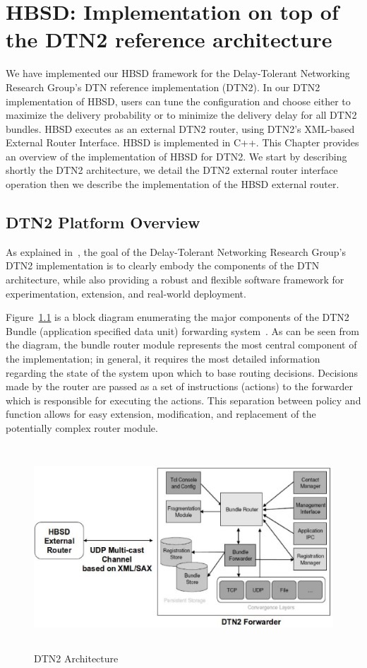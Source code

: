 ﻿\chapter{HBSD: Implementation on top of the DTN2 reference architecture}
\label{chapter:HBSD}
\minitoc

We have implemented our HBSD framework for the Delay-Tolerant Networking Research Group's DTN reference implementation (DTN2). 
In our DTN2 implementation of HBSD, users can tune the configuration and choose either to maximize the
delivery probability or to minimize the delivery delay for all DTN2 bundles. HBSD executes as an external DTN2 router, using DTN2's XML-based External Router Interface. HBSD is implemented in C++. This Chapter provides an overview of the implementation of HBSD for DTN2. We start by describing shortly the DTN2 architecture, we detail the DTN2 external router interface operation then we describe the implementation of the HBSD external router.

\section{DTN2 Platform Overview}
\label{DTN2}

As explained in~\cite{DTN2Manual}, the goal of the Delay-Tolerant Networking Research Group's DTN2 implementation is to clearly embody the components of the DTN architecture, while also providing a robust and flexible software framework for experimentation, extension, and real-world deployment.

Figure~\ref{DTN2-Arch} is a block diagram enumerating the major components of the DTN2 Bundle (application specified data 
unit) forwarding system~\cite{Demmer03implementingdelay}. As can be seen from the diagram, the bundle router module represents the most central component of the implementation; in general, it requires the most detailed information regarding the state of the system upon which to base routing decisions. Decisions made by the router are passed as a set of instructions (actions) to the forwarder which is responsible for executing the actions. This separation between policy and function allows for easy extension, modification, and replacement of the potentially complex router module. 

\begin{figure}[!h]
\centering
\includegraphics[width=5in,height=3in]{Chapitre4/HBSD-DTN2.eps}
\caption{DTN2 Architecture}
\label{DTN2-Arch}
\end{figure}

